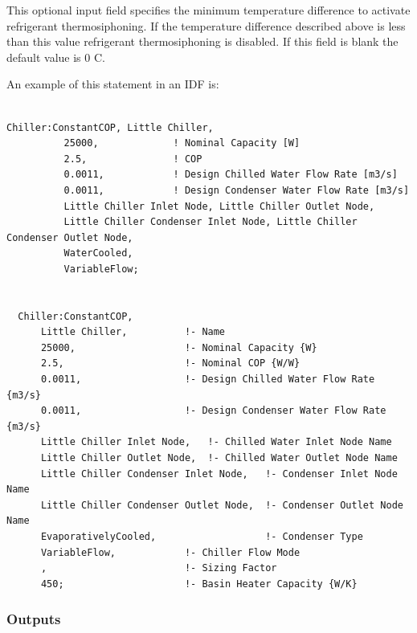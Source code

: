 This optional input field specifies the minimum temperature difference to activate refrigerant thermosiphoning. If the temperature difference described above is less than this value refrigerant thermosiphoning is disabled. If this field is blank the default value is 0 C.

An example of this statement in an IDF is:

\begin{lstlisting}

Chiller:ConstantCOP, Little Chiller,
          25000,             ! Nominal Capacity [W]
          2.5,               ! COP
          0.0011,            ! Design Chilled Water Flow Rate [m3/s]
          0.0011,            ! Design Condenser Water Flow Rate [m3/s]
          Little Chiller Inlet Node, Little Chiller Outlet Node,
          Little Chiller Condenser Inlet Node, Little Chiller Condenser Outlet Node,
          WaterCooled,
          VariableFlow;


  Chiller:ConstantCOP,
      Little Chiller,          !- Name
      25000,                   !- Nominal Capacity {W}
      2.5,                     !- Nominal COP {W/W}
      0.0011,                  !- Design Chilled Water Flow Rate {m3/s}
      0.0011,                  !- Design Condenser Water Flow Rate {m3/s}
      Little Chiller Inlet Node,   !- Chilled Water Inlet Node Name
      Little Chiller Outlet Node,  !- Chilled Water Outlet Node Name
      Little Chiller Condenser Inlet Node,   !- Condenser Inlet Node Name
      Little Chiller Condenser Outlet Node,  !- Condenser Outlet Node Name
      EvaporativelyCooled,                   !- Condenser Type
      VariableFlow,            !- Chiller Flow Mode
      ,                        !- Sizing Factor
      450;                     !- Basin Heater Capacity {W/K}
\end{lstlisting}

\subsubsection{Outputs}\label{outputs-2-015}

